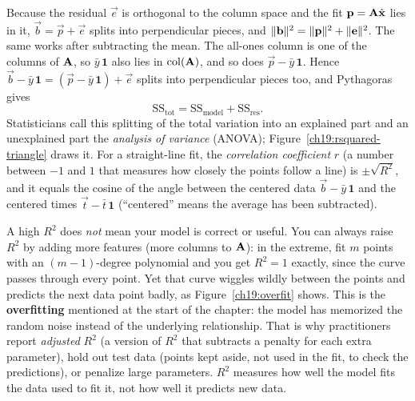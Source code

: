 \begin{connectionbox}
Because the residual $\vec{e}$ is orthogonal to
the column space and the fit $\mathbf{p}=\mathbf{A}\hat{\mathbf{x}}$ lies in it, $\vec{b}=\vec{p}+\vec{e}$
splits into perpendicular pieces, and $\lVert\mathbf{b}\rVert^2=\lVert\mathbf{p}\rVert^2+\lVert\mathbf{e}\rVert^2$.
The same works after subtracting the mean. The all-ones column is one of the columns of $\mathbf{A}$,
so $\bar{y}\,\mathbf{1}$ also lies in $\operatorname{col}(\mathbf{A})$, and so does $\vec{p}-\bar{y}\,\mathbf{1}$.
Hence $\vec{b}-\bar{y}\,\mathbf{1}=(\vec{p}-\bar{y}\,\mathbf{1})+\vec{e}$ splits into perpendicular
pieces too, and Pythagoras gives
\[
  \mathrm{SS_{tot}}=\mathrm{SS_{model}}+\mathrm{SS_{res}}.
\]
Statisticians call this splitting of the total variation into an explained part and an unexplained
part the \emph{analysis of variance} (ANOVA); Figure~\ref{ch19:rsquared-triangle} draws it. For a
straight-line fit, the \emph{correlation coefficient} $r$ (a number between $-1$ and $1$ that
measures how closely the points follow a line) is $\pm\sqrt{R^2}$, and it equals the cosine of the
angle between the centered data $\vec{b}-\bar{y}\,\mathbf{1}$ and the centered times
$\vec{t}-\bar{t}\,\mathbf{1}$ (``centered'' means the average has been subtracted).
\end{connectionbox}

\begin{trapbox}
A high $R^2$ does \emph{not} mean your model is correct or useful. You can always raise $R^2$ by
adding more features (more columns to $\mathbf{A}$): in the extreme, fit $m$ points with an
$(m{-}1)$-degree polynomial and you get $R^2=1$ exactly, since the curve passes through every point.
Yet that curve wiggles wildly between the points and predicts the next data point badly, as
Figure~\ref{ch19:overfit} shows. This is the \textbf{overfitting} mentioned at the start of the
chapter: the model has memorized the random noise instead of the underlying relationship. That is
why practitioners report \emph{adjusted} $R^2$ (a version of $R^2$ that subtracts a penalty for each
extra parameter), hold out test data (points kept aside, not used in the fit, to check the
predictions), or penalize large parameters. $R^2$ measures how well the model fits the data used to
fit it, not how well it predicts new data.
\end{trapbox}

